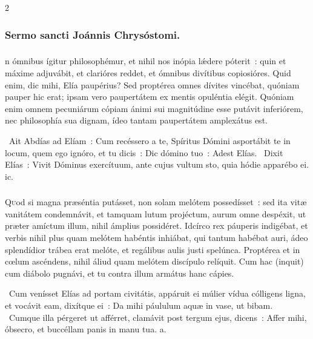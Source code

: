 \documentclass[9pt,twoside]{extarticle}
\begin{document}
\begin{multicols}{2}
{\subsubsection*{\center Sermo sancti Joánnis Chrysóstomi.}
\subsubsection*{\center {}}
n ómnibus ígitur philosophémur, et nihil nos inópia lǽdere póterit~: quin et máxime adjuvábit, et clarióres reddet, et ómnibus divítibus copiosióres. Quid enim, dic mihi, Elía paupérius? Sed proptérea omnes dívites vincébat, quóniam pauper hic erat; ipsam vero paupertátem ex mentis opuléntia elégit. Quóniam enim omnem pecuniárum cópiam ánimi sui magnitúdine esse putávit inferiórem, nec philosophía sua dignam, ídeo tantam paupertátem amplexátus est.

\begin{tightlist}{}
\item {}~Ait Abdías ad Elíam~: Cum recéssero a te, Spíritus Dómini asportábit te in locum, quem ego ignóro, et tu dicis~: \textred{*} Dic dómino tuo~: Adest Elías. ~Dixit Elías~: Vivit Dóminus exercítuum, ante cujus vultum sto, quia hódie apparébo ei. ic.
\end{tightlist}

\subsubsection*{\center {}}
\lettrine{Q}uod si magna præséntia putásset, non solam melótem possedísset~: sed ita vitæ vanitátem condemnávit, et tamquam lutum projéctum, aurum omne despéxit, ut præter amíctum illum, nihil ámplius possidéret. Idcírco rex páuperis indigébat, et verbis nihil plus quam melótem habéntis inhiábat, qui tantum habébat auri, ádeo splendídior trábea erat melóte, et regálibus aulis justi spelúnca. Proptérea et in cœlum ascéndens, nihil áliud quam melótem discípulo relíquit. Cum hac (inquit) cum diábolo pugnávi, et tu contra illum armátus hanc cápies.

\begin{tightlist}{}
\item {}~Cum venísset Elías ad portam civitátis, appáruit ei múlier vídua cólligens ligna, et vocávit eam, dixítque ei~: \textred{*} Da mihi páululum aquæ in vase, ut bibam. ~Cumque illa pérgeret ut afférret, clamávit post tergum ejus, dicens~: Affer mihi, óbsecro, et buccéllam panis in manu tua. a.
\end{tightlist}

}
\end{multicols}
\end{document}
